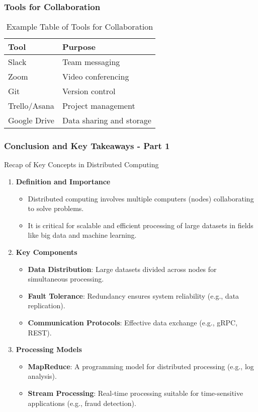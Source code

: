 \documentclass[aspectratio=169]{beamer}
\begin{document}
\begin{frame}[fragile]
    \frametitle{Tools for Collaboration}
    \begin{table}[h]
        \centering
        \begin{tabular}{|l|l|}
            \hline
            \textbf{Tool} & \textbf{Purpose} \\ 
            \hline
            Slack & Team messaging \\ 
            Zoom & Video conferencing \\ 
            Git & Version control \\ 
            Trello/Asana & Project management \\ 
            Google Drive & Data sharing and storage \\ 
            \hline
        \end{tabular}
        \caption{Example Table of Tools for Collaboration}
    \end{table}
\end{frame}

\begin{frame}[fragile]
  \frametitle{Conclusion and Key Takeaways - Part 1}
  \begin{block}{Recap of Key Concepts in Distributed Computing}
    \begin{enumerate}
      \item \textbf{Definition and Importance}
      \begin{itemize}
        \item Distributed computing involves multiple computers (nodes) collaborating to solve problems.
        \item It is critical for scalable and efficient processing of large datasets in fields like big data and machine learning.
      \end{itemize}
      
      \item \textbf{Key Components}
      \begin{itemize}
        \item \textbf{Data Distribution}: Large datasets divided across nodes for simultaneous processing.
        \item \textbf{Fault Tolerance}: Redundancy ensures system reliability (e.g., data replication).
        \item \textbf{Communication Protocols}: Effective data exchange (e.g., gRPC, REST).
      \end{itemize}

      \item \textbf{Processing Models}
      \begin{itemize}
        \item \textbf{MapReduce}: A programming model for distributed processing (e.g., log analysis).
        \item \textbf{Stream Processing}: Real-time processing suitable for time-sensitive applications (e.g., fraud detection).
      \end{itemize}
    \end{enumerate}
  \end{block}
\end{frame}
\end{document}

